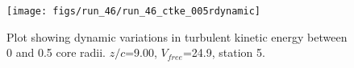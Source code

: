 \begin{figure}[H]
\centering
\texttt{[image: figs/run\_46/run\_46\_ctke\_005rdynamic]}
\caption{Plot showing dynamic variations in turbulent kinetic energy between 0 and 0.5 core radii. $z/c$=9.00, $V_{free}$=24.9, station 5.}
\end{figure}


